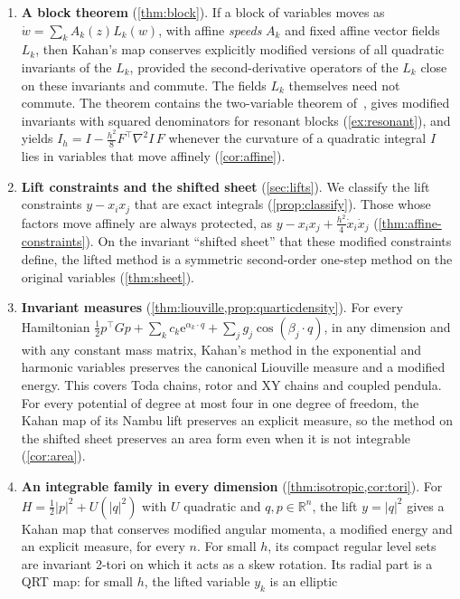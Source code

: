 \documentclass[11pt,a4paper]{article}
\theoremstyle{definition}
\theoremstyle{remark}
\newcommand{\R}{\mathbb{R}}
\newcommand{\tr}{^{\!\top}}
\begin{document}
\begin{enumerate}[leftmargin=*,label=(\roman*)]
\item \textbf{A block theorem} (\cref{thm:block}). If a block of variables moves as
  $\dot w=\sum_kA_k(z)L_k(w)$, with affine \emph{speeds} $A_k$ and fixed affine vector fields $L_k$, then
  Kahan's map conserves explicitly modified versions of all quadratic invariants of the $L_k$, provided the
  second-derivative operators of the $L_k$ close on these invariants and commute. The fields $L_k$
  themselves need not commute. The theorem contains the two-variable theorem of~\cite{CMOQ19}, gives
  modified invariants with squared denominators for resonant blocks (\cref{ex:resonant}), and yields
  $I_h=I-\tfrac{h^2}{8}F\tr\nabla^2I\,F$ whenever the curvature of a quadratic integral $I$ lies in variables
  that move affinely (\cref{cor:affine}).
\item \textbf{Lift constraints and the shifted sheet} (\cref{sec:lifts}). We classify the lift constraints
  $y-x_ix_j$ that are exact integrals (\cref{prop:classify}). Those whose factors move affinely are always
  protected, as $y-x_ix_j+\tfrac{h^2}{4}\dot x_i\dot x_j$ (\cref{thm:affine-constraints}). On the invariant
  ``shifted sheet'' that these modified constraints define, the lifted method is a symmetric second-order
  one-step method on the original variables (\cref{thm:sheet}).
\item \textbf{Invariant measures} (\cref{thm:liouville,prop:quarticdensity}). For every Hamiltonian
  $\frac12p\tr Gp+\sum_kc_k\mathrm e^{\alpha_k\cdot q}+\sum_jg_j\cos(\beta_j\cdot q)$, in any dimension and with
  any constant mass matrix, Kahan's method in the exponential and harmonic variables preserves the
  canonical Liouville measure and a modified energy. This covers Toda chains, rotor and XY chains and coupled
  pendula. For every potential of degree at most four in one degree of freedom, the Kahan map of its Nambu
  lift preserves an explicit measure, so the method on the shifted sheet preserves an area form even when it is
  not integrable (\cref{cor:area}).
\item \textbf{An integrable family in every dimension} (\cref{thm:isotropic,cor:tori}). For
  $H=\frac12\lvert p\rvert^2+U(\lvert q\rvert^2)$ with $U$ quadratic and $q,p\in\R^n$, the lift
  $y=\lvert q\rvert^2$ gives a Kahan map that conserves modified angular momenta, a modified energy and an
  explicit measure, for every $n$. For small $h$, its compact regular level sets are invariant 2-tori on which it
  acts as a skew rotation. Its radial part is a QRT map: for small $h$, the lifted variable $y_k$ is an elliptic

\end{enumerate}
\end{document}
